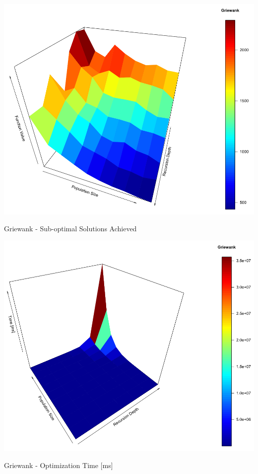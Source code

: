 \documentclass[a0,portrait,25pt]{sciposter}
\begin{document}
\begin{multicols}{3}
\begin{mdframed}[backgroundcolor=white,roundcorner=4pt,shadow=true,linewidth=1pt]
\begin{minipage}[c]{1\linewidth}
\includegraphics[width=0.9\linewidth]{fig06}
\caption{Griewank - Sub-optimal Solutions Achieved}
\end{minipage}

\begin{minipage}[c]{1\linewidth}
\includegraphics[width=0.9\linewidth]{fig07}
\caption{Griewank - Optimization Time [ms]}
\end{minipage}


\end{mdframed}
\end{multicols}
\end{document}
